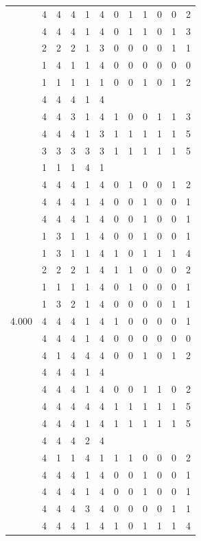 \documentclass[]{msu-thesis}
\theoremstyle{definition}
\theoremstyle{definition}
\theoremstyle{definition}
\theoremstyle{remark}
\begin{document}
\begin{table}
{\begin{tabular}[t]{rrrrrrrrrrrr}
 & 4 & 4 & 4 & 1 & 4 & 0 & 1 & 1 & 0 & 0 & 2\\
 & 4 & 4 & 4 & 1 & 4 & 0 & 1 & 1 & 0 & 1 & 3\\
 & 2 & 2 & 2 & 1 & 3 & 0 & 0 & 0 & 0 & 1 & 1\\
 & 1 & 4 & 1 & 1 & 4 & 0 & 0 & 0 & 0 & 0 & 0\\
 & 1 & 1 & 1 & 1 & 1 & 0 & 0 & 1 & 0 & 1 & 2\\
 & 4 & 4 & 4 & 1 & 4 &  &  &  &  &  & \\
 & 4 & 4 & 3 & 1 & 4 & 1 & 0 & 0 & 1 & 1 & 3\\
 & 4 & 4 & 4 & 1 & 3 & 1 & 1 & 1 & 1 & 1 & 5\\
 & 3 & 3 & 3 & 3 & 3 & 1 & 1 & 1 & 1 & 1 & 5\\
 & 1 & 1 & 1 & 4 & 1 &  &  &  &  &  & \\
 & 4 & 4 & 4 & 1 & 4 & 0 & 1 & 0 & 0 & 1 & 2\\
 & 4 & 4 & 4 & 1 & 4 & 0 & 0 & 1 & 0 & 0 & 1\\
 & 4 & 4 & 4 & 1 & 4 & 0 & 0 & 1 & 0 & 0 & 1\\
 & 1 & 3 & 1 & 1 & 4 & 0 & 0 & 1 & 0 & 0 & 1\\
 & 1 & 3 & 1 & 1 & 4 & 1 & 0 & 1 & 1 & 1 & 4\\
 & 2 & 2 & 2 & 1 & 4 & 1 & 1 & 0 & 0 & 0 & 2\\
 & 1 & 1 & 1 & 1 & 4 & 0 & 1 & 0 & 0 & 0 & 1\\
 & 1 & 3 & 2 & 1 & 4 & 0 & 0 & 0 & 0 & 1 & 1\\
4.000 & 4 & 4 & 4 & 1 & 4 & 1 & 0 & 0 & 0 & 0 & 1\\
 & 4 & 4 & 4 & 1 & 4 & 0 & 0 & 0 & 0 & 0 & 0\\
 & 4 & 1 & 4 & 4 & 4 & 0 & 0 & 1 & 0 & 1 & 2\\
 & 4 & 4 & 4 & 1 & 4 &  &  &  &  &  & \\
 & 4 & 4 & 4 & 1 & 4 & 0 & 0 & 1 & 1 & 0 & 2\\
 & 4 & 4 & 4 & 4 & 4 & 1 & 1 & 1 & 1 & 1 & 5\\
 & 4 & 4 & 4 & 1 & 4 & 1 & 1 & 1 & 1 & 1 & 5\\
 & 4 & 4 & 4 & 2 & 4 &  &  &  &  &  & \\
 & 4 & 1 & 1 & 4 & 1 & 1 & 1 & 0 & 0 & 0 & 2\\
 & 4 & 4 & 4 & 1 & 4 & 0 & 0 & 1 & 0 & 0 & 1\\
 & 4 & 4 & 4 & 1 & 4 & 0 & 0 & 1 & 0 & 0 & 1\\
 & 4 & 4 & 4 & 3 & 4 & 0 & 0 & 0 & 0 & 1 & 1\\
 & 4 & 4 & 4 & 1 & 4 & 1 & 0 & 1 & 1 & 1 & 4\\

\end{tabular}}
\end{table}
\end{document}
